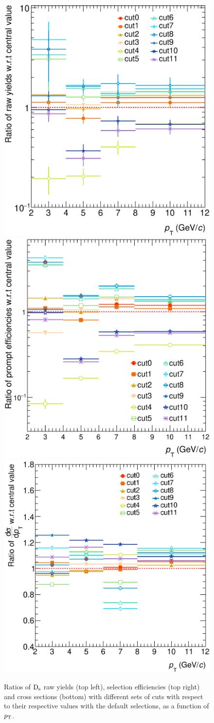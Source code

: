  
\begin{figure}[!h]
\begin{center}
 \includegraphics[width=.49\textwidth]{FigCap4/cutVariationPlot_pass4_rawY.eps}
 \includegraphics[width=.49\textwidth]{FigCap4/efficiencies_cuts0to12.eps}
 \includegraphics[width=.49\textwidth]{FigCap4/cutVariationPlot_pass4.eps}
\caption{Ratios of ${\rm D_s}$ raw yields (top left), selection efficiencies (top right) and cross sections (bottom) with different sets of cuts with respect to their respective values with the default selections, as a function of $p_{\rm T}$.}             
\label{fig:cutVar}
\end{center}
\end{figure} 

